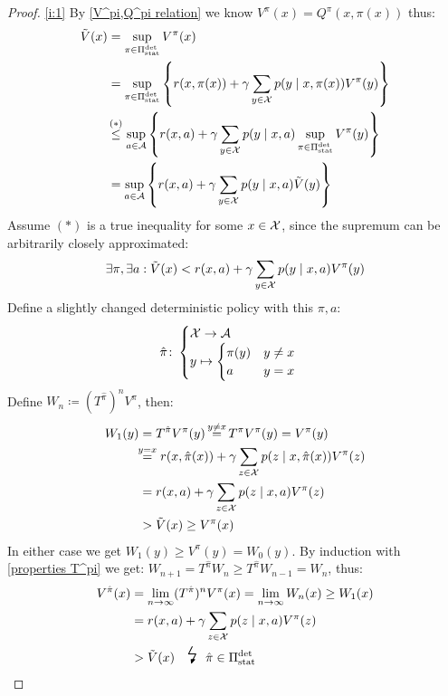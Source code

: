 \begin{proof} \ref{i:1}
By \ref{V^pi,Q^pi relation} we know \(V^\pi(x)=Q^\pi(x,\pi(x))\) thus:
\begin{align*}
	\tilde{V}(x)& =\sup_{\pi \in \detPolicy} V^\pi(x)\\
	&= \sup_{\pi\in\detPolicy} \left\{ r(x,\pi(x))+\gamma\sum\limits_{y\in\cX}p(y\mid x,\pi(x)) V^\pi(y) \right\}\\
	&\lxlq{(*)}\sup_{a\in \cA}\left\{ r(x,a)+\gamma\sum\limits_{y\in\cX}p(y\mid x,a) 
	\sup_{\pi\in\detPolicy} V^\pi(y) \right\}\\
	&=\sup_{a\in \cA}\left\{ r(x,a)+\gamma\sum\limits_{y\in\cX}p(y\mid x,a) 
	 \tilde{V}(y) \right\}
\end{align*}
Assume \((*)\) is a true inequality for some \(x\in\mathcal{X}\), since the supremum can be arbitrarily closely approximated:
\[ \exists \pi, \exists a : \tilde{V}(x) < r(x,a) + \gamma\sum_{y\in\mathcal{X}} p(y\mid x,a) V^\pi(y)\]
Define a slightly changed deterministic policy with this \(\pi,a\):
\begin{align*}
	\hat{\pi}\colon
	\begin{cases}
		\mathcal{X}\to\mathcal{A}\\
		y\mapsto
		\begin{cases}
			\pi(y) & y\neq x\\
			a & y=x
		\end{cases}
	\end{cases}
\end{align*}
Define \(W_n\coloneqq (T^{\hat{\pi}})^n V^\pi\), then:
\begin{align*}
	W_1(y)&=T^{\hat{\pi}}V^\pi(y) \xeq{y\neq x} T^\pi V^\pi(y) = V^\pi(y)\\
	&\lxeq{y=x} r(x, \hat{\pi}(x)) 
	+ \gamma \sum_{z\in\cX} p(z \mid x, \hat{\pi}(x)) V^\pi(z)  \\
	&=r(x, a) + \gamma \sum_{z\in\cX} p(z \mid x, a) V^\pi(z) \\
	&> \tilde{V}(x) \ge V^\pi(x)
\end{align*}
In either case we get \(W_1(y)\ge V^\pi(y)=W_0(y) \).
By induction with \ref{properties T^pi} we get: \(W_{n+1}=T^{\hat{\pi}}W_n \ge T^{\hat{\pi}}W_{n-1}=W_n\), thus:
\begin{align*}
	V^{\hat{\pi}}(x)&=\lim_{n\to\infty}(T^{\hat{\pi}})^n V^\pi(x)=\lim_{n\to\infty} W_n(x)\ge W_1(x) \\
	&=r(x, a) + \gamma \sum_{z\in\cX} p(z \mid x, a) V^\pi(z) \\
	&> \tilde{V}(x) \contradiction{\hat{\pi}\in\detPolicy}
\end{align*}
\end{proof}


